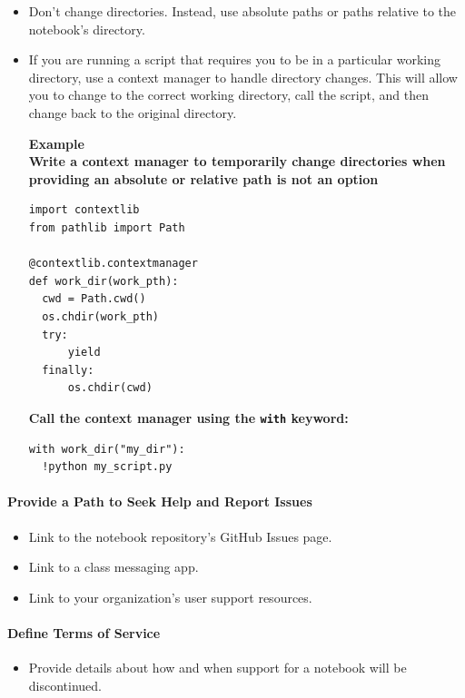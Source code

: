 \begin{itemize}
\item Don't change directories. Instead, use absolute paths or paths relative to the notebook's directory.


\item If you are running a script that requires you to be in a particular working directory, use a context manager to handle directory changes. This will allow you to change to the correct working directory, call the script, and then change back to the original directory.

\begin{framed}
\textbf{Example}\\
\textbf{Write a context manager to temporarily change directories when providing an absolute or relative path is not an option}

\begin{verbatim}
import contextlib
from pathlib import Path

@contextlib.contextmanager
def work_dir(work_pth):
  cwd = Path.cwd()
  os.chdir(work_pth)
  try:
      yield
  finally:
      os.chdir(cwd)
\end{verbatim}

\textbf{Call the context manager using the \texttt{with} keyword:}

\begin{verbatim}
with work_dir("my_dir"):
  !python my_script.py
\end{verbatim}
\end{framed}
\end{itemize}

\paragraph{Provide a Path to Seek Help and Report Issues}

\begin{itemize}
\item Link to the notebook repository's GitHub Issues page.
\item Link to a class messaging app.
\item Link to your organization's user support resources.
\end{itemize}

\paragraph{Define Terms of Service}

\begin{itemize}
\item Provide details about how and when support for a notebook will be discontinued.
\end{itemize}